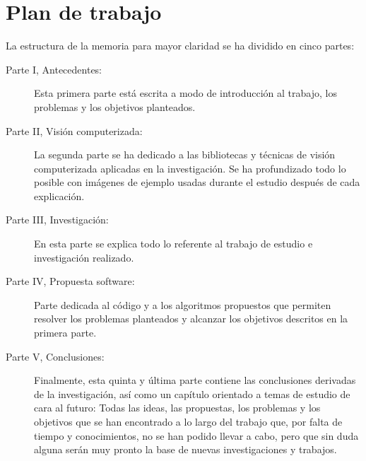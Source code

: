 \chapter{Plan de trabajo}
La estructura de la memoria para mayor claridad se ha dividido en
cinco partes:
\begin{description}
\item[Parte I, Antecedentes:] Esta primera parte está escrita a modo
  de introducción al trabajo, los problemas y los objetivos planteados.
\item[Parte II, Visión computerizada:] La segunda parte se ha
  dedicado a las bibliotecas y técnicas de visión computerizada
  aplicadas en la investigación. Se ha profundizado todo lo
  posible con imágenes de ejemplo usadas durante el estudio después de
  cada explicación.
\item[Parte III, Investigación:] En esta parte se explica
  todo lo referente al trabajo de estudio e investigación realizado.
\item[Parte IV, Propuesta software:] Parte dedicada al código y a los 
  algoritmos propuestos que permiten resolver los problemas planteados 
  y alcanzar los objetivos descritos en la primera parte.
\item[Parte V, Conclusiones:] Finalmente, esta
  quinta y última parte contiene las conclusiones derivadas de la
  investigación, así como un capítulo orientado a temas de estudio
  de cara al futuro: Todas las ideas, las propuestas, los problemas 
  y los objetivos que se han encontrado a lo largo del trabajo que, 
  por falta de tiempo y conocimientos, no se han podido llevar a cabo, 
  pero que sin duda alguna serán muy pronto la base de nuevas investigaciones 
  y trabajos.
\end{description}